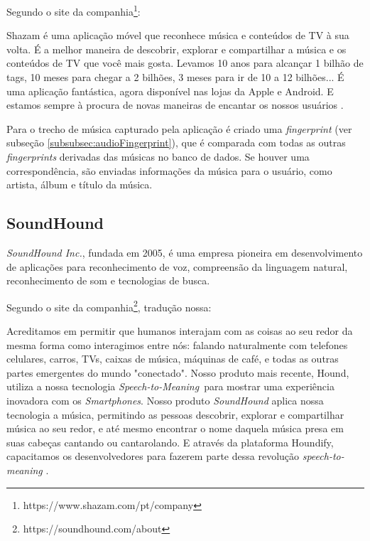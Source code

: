Segundo o site da companhia\footnote{https://www.shazam.com/pt/company}:

\begin{citacao}
Shazam é uma aplicação móvel que reconhece música e conteúdos de TV à sua volta. É a melhor maneira de descobrir, explorar e compartilhar a música e os conteúdos de TV que você mais gosta. Levamos 10 anos para alcançar 1 bilhão de tags, 10 meses para chegar a 2 bilhões, 3 meses para ir de 10 a 12 bilhões... É uma aplicação fantástica, agora disponível nas lojas da Apple e Android. E estamos sempre à procura de novas maneiras de encantar os nossos usuários \cite{shazam2000}.
\end{citacao}

Para o trecho de música capturado pela aplicação é criado uma \textit{fingerprint} (ver subseção \ref{subsubsec:audioFingerprint}), que é comparada com todas as outras \textit{fingerprints} derivadas das músicas no banco de dados. Se houver uma correspondência, são enviadas informações da música para o usuário, como artista, álbum e título da música.

\subsection{SoundHound} \label{subsec:soundhound}
\textit{SoundHound Inc.}, fundada em 2005, é uma empresa pioneira em desenvolvimento de aplicações para reconhecimento de voz, compreensão da linguagem natural, reconhecimento de som e tecnologias de busca.

Segundo o site da companhia\footnote{https://soundhound.com/about}, tradução nossa:

\begin{citacao}
Acreditamos em permitir que humanos interajam com as coisas ao seu redor da mesma forma como interagimos entre nós: falando naturalmente com telefones celulares, carros, TVs, caixas de música, máquinas de café, e todas as outras partes emergentes do mundo "conectado". Nosso produto mais recente, Hound, utiliza a nossa tecnologia \textit{Speech-to-Meaning}\texttrademark\ para mostrar uma experiência inovadora com os \textit{Smartphones}. Nosso produto \textit{SoundHound} aplica nossa tecnologia a música, permitindo as pessoas descobrir, explorar e compartilhar música ao seu redor, e até mesmo encontrar o nome daquela música presa em suas cabeças cantando ou cantarolando. E através da plataforma Houndify, capacitamos os desenvolvedores para fazerem parte dessa revolução \textit{speech-to-meaning} \cite{soundhound2005}.
\end{citacao}

